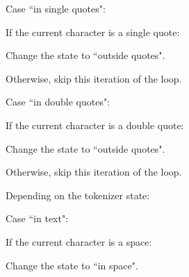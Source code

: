 \documentclass{article}
\begin{document}
\begin{deepenum}
\begin{deepenum}
\begin{deepenum}
                        Case ``in single quotes":
                        \begin{deepenum}
                            \item
                                If the current character is a single quote:
                                    \begin{deepenum}
                                        \item
                                            Change the state to ``outside quotes".
                                    \end{deepenum}
                            \item
                                Otherwise, skip this iteration of the loop.
                        \end{deepenum}
                    \item
                        Case ``in double quotes":
                        \begin{deepenum}
                            \item
                                If the current character is a double quote:
                                    \begin{deepenum}
                                        \item
                                            Change the state to ``outside quotes".
                                    \end{deepenum}
                            \item
                                Otherwise, skip this iteration of the loop.
                        \end{deepenum}
                \end{deepenum}
            \item
                Depending on the tokenizer state:
                \begin{deepenum}
                    \item
                        Case ``in text":
                            \begin{deepenum}
                                \item
                                    If the current character is a space:
                                    \begin{deepenum}
                                        \item
                                            Change the state to ``in space".

\end{deepenum}
\end{deepenum}
\end{deepenum}
\end{deepenum}
\end{deepenum}
\end{document}
